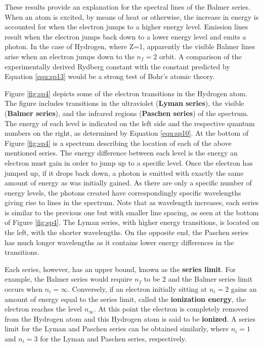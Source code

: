 These results provide an explanation for the spectral lines of the Balmer series. When an atom is excited, by means of heat or otherwise, the increase in energy is accounted for when the electron jumps to a higher energy level. Emission lines result when the electron jumps back down to a lower energy level and emits a photon. In the case of Hydrogen, where Z=1, apparently the visible Balmer lines arise when an electron jumps down to the $n_f=2$ orbit. A comparison of the experimentally derived Rydberg constant with the constant predicted by Equation \ref{equ:sp13} would be a strong test of Bohr's atomic theory.

Figure \ref{fig:sp4} depicts some of the electron transitions in the Hydrogen atom. The figure includes transitions in the ultraviolet ({\bf Lyman series}), the visible ({\bf Balmer series}), and the infrared regions ({\bf Paschen series}) of the spectrum. The energy of each level is indicated on the left side and the respective quantum numbers on the right, as determined by Equation \ref{equ:sp10}. At the bottom of Figure \ref{fig:sp4} is a spectrum describing the location of each of the above mentioned series. The energy difference between each level is the energy an electron must gain in order to jump up to a specific level. Once the electron has jumped up, if it drops back down, a photon is emitted with exactly the same amount of energy as was initially gained. As there are only a specific number of energy levels, the photons created have correspondingly specific wavelengths giving rise to lines in the spectrum. Note that as wavelength increases, each series is similar to the previous one but with smaller line spacing, as seen at the bottom of Figure \ref{fig:sp4}. The Lyman series, with higher energy transitions, is located on the left, with the shorter wavelengths. On the opposite end, the Paschen series has much longer wavelengths as it contains lower energy differences in the transitions.

Each series, however, has an upper bound, known as the {\bf series limit}. For example, the Balmer series would require $n_f$ to be 2 and the Balmer series limit occurs when $n_i=\infty$. Conversely, if an electron initially sitting at $n_i=2$ gains an amount of energy equal to the series limit, called the {\bf ionization energy}, the electron reaches the level $n_{\infty}$. At this point the electron is completely removed from the Hydrogen atom and this Hydrogen atom is said to be {\bf ionized}. A series limit for the Lyman and Paschen series can be obtained similarly, where $n_i=1$ and $n_i=3$ for the Lyman and Paschen series, respectively. 

